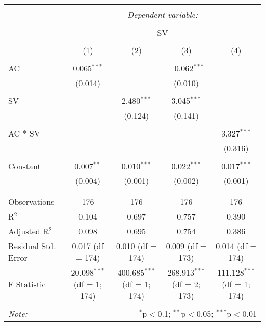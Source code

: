 
\begin{table}[!htbp] \centering 
  \caption{} 
  \label{} 
\begin{tabular}{@{\extracolsep{5pt}}lcccc} 
\\[-1.8ex]\hline 
\hline \\[-1.8ex] 
 & \multicolumn{4}{c}{\textit{Dependent variable:}} \\ 
\cline{2-5} 
\\[-1.8ex] & \multicolumn{4}{c}{SV} \\ 
\\[-1.8ex] & (1) & (2) & (3) & (4)\\ 
\hline \\[-1.8ex] 
 AC & 0.065$^{***}$ &  & $-$0.062$^{***}$ &  \\ 
  & (0.014) &  & (0.010) &  \\ 
  & & & & \\ 
 SV &  & 2.480$^{***}$ & 3.045$^{***}$ &  \\ 
  &  & (0.124) & (0.141) &  \\ 
  & & & & \\ 
 AC * SV &  &  &  & 3.327$^{***}$ \\ 
  &  &  &  & (0.316) \\ 
  & & & & \\ 
 Constant & 0.007$^{**}$ & 0.010$^{***}$ & 0.022$^{***}$ & 0.017$^{***}$ \\ 
  & (0.004) & (0.001) & (0.002) & (0.001) \\ 
  & & & & \\ 
\hline \\[-1.8ex] 
Observations & 176 & 176 & 176 & 176 \\ 
R$^{2}$ & 0.104 & 0.697 & 0.757 & 0.390 \\ 
Adjusted R$^{2}$ & 0.098 & 0.695 & 0.754 & 0.386 \\ 
Residual Std. Error & 0.017 (df = 174) & 0.010 (df = 174) & 0.009 (df = 173) & 0.014 (df = 174) \\ 
F Statistic & 20.098$^{***}$ (df = 1; 174) & 400.685$^{***}$ (df = 1; 174) & 268.913$^{***}$ (df = 2; 173) & 111.128$^{***}$ (df = 1; 174) \\ 
\hline 
\hline \\[-1.8ex] 
\textit{Note:}  & \multicolumn{4}{r}{$^{*}$p$<$0.1; $^{**}$p$<$0.05; $^{***}$p$<$0.01} \\ 
\end{tabular} 
\end{table} 
